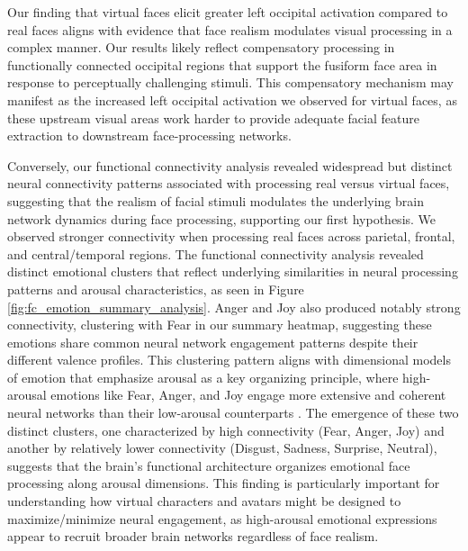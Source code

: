 Our finding that virtual faces elicit greater left occipital activation compared to real faces aligns with evidence that face realism modulates visual processing in a complex manner. 
Our results likely reflect compensatory processing in functionally connected occipital regions that support the fusiform face area in response to perceptually challenging stimuli. 
This compensatory mechanism may manifest as the increased left occipital activation we observed for virtual faces, as these upstream visual areas work harder to provide adequate facial feature extraction to downstream face-processing networks.

Conversely, our functional connectivity analysis revealed widespread but distinct neural connectivity patterns associated with processing real versus virtual faces, suggesting that the realism of facial stimuli modulates the underlying brain network dynamics during face processing, supporting our first hypothesis.
We observed stronger connectivity when processing real faces across parietal, frontal, and central/temporal regions. 
The functional connectivity analysis revealed distinct emotional clusters that reflect underlying similarities in neural processing patterns and arousal characteristics, as seen in Figure \ref{fig:fc_emotion_summary_analysis}.
Anger and Joy also produced notably strong connectivity, clustering with Fear in our summary heatmap, suggesting these emotions share common neural network engagement patterns despite their different valence profiles.
This clustering pattern aligns with dimensional models of emotion that emphasize arousal as a key organizing principle, where high-arousal emotions like Fear, Anger, and Joy engage more extensive and coherent neural networks than their low-arousal counterparts \citep{ke_dynamic_2025}.
The emergence of these two distinct clusters, one characterized by high connectivity (Fear, Anger, Joy) and another by relatively lower connectivity (Disgust, Sadness, Surprise, Neutral), suggests that the brain's functional architecture organizes emotional face processing along arousal dimensions. 
This finding is particularly important for understanding how virtual characters and avatars might be designed to maximize/minimize neural engagement, as high-arousal emotional expressions appear to recruit broader brain networks regardless of face realism.

